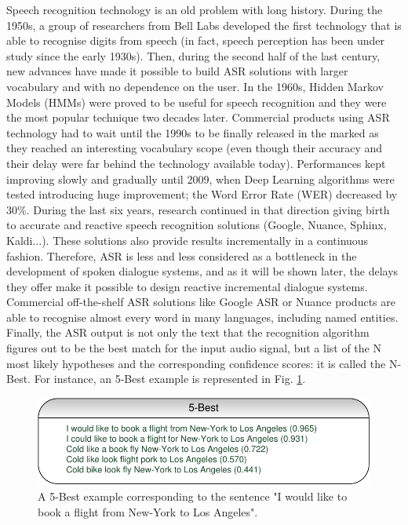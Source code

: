 		Speech recognition technology is an old problem with long history. During the 1950s, a group of researchers from Bell Labs developed the first technology that is able to recognise digits from speech (in fact, speech perception has been under study since the early 1930s). Then, during the second half of the last century, new advances have made it possible to build ASR solutions with larger vocabulary and with no dependence on the user. In the 1960s, Hidden Markov Models (HMMs) were proved to be useful for speech recognition \cite{Gales2007} and they were the most popular technique two decades later. Commercial products using ASR technology had to wait until the 1990s to be finally released in the marked as they reached an interesting vocabulary scope (even though their accuracy and their delay were far behind the technology available today). Performances kept improving slowly and gradually until 2009, when Deep Learning algorithms were tested \cite{Mohamed2009,Deng2013} introducing huge improvement; the Word Error Rate (WER) decreased by 30\%. During the last six years, research continued in that direction giving birth to accurate and reactive speech recognition solutions (Google, Nuance, Sphinx, Kaldi...). These solutions also provide results incrementally in a continuous fashion. Therefore, ASR is less and less considered as a bottleneck in the development of spoken dialogue systems, and as it will be shown later, the delays they offer make it possible to design reactive incremental dialogue systems. Commercial off-the-shelf ASR solutions like Google ASR or Nuance products are able to recognise almost every word in many languages, including named entities. Finally, the ASR output is not only the text that the recognition algorithm figures out to be the best match for the input audio signal, but a list of the N most likely hypotheses and the corresponding confidence scores: it is called the N-Best. For instance, an 5-Best example is represented in Fig. \ref{fig:dialchain}.
		
		\begin{figure}
			\centering
			\includegraphics[scale=1]{figures/5BestEx.pdf}
			\caption{A 5-Best example corresponding to the sentence "I would like to book a flight from New-York to Los Angeles".}
			\label{fig:dialchain}
		\end{figure}
		
